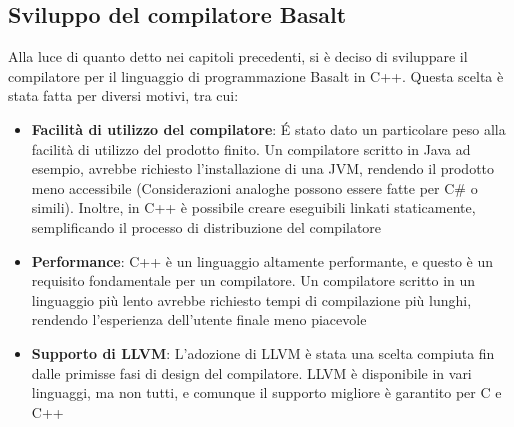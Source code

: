 \subsection{Sviluppo del compilatore Basalt}
Alla luce di quanto detto nei capitoli precedenti, si è deciso di sviluppare il compilatore 
per il linguaggio di programmazione Basalt in C++. Questa scelta è stata fatta per diversi motivi, 
tra cui:

\begin{itemize}
    \item \textbf{Facilità di utilizzo del compilatore}: É stato dato un particolare peso alla facilità di utilizzo 
    del prodotto finito. Un compilatore scritto in Java ad esempio, avrebbe richiesto l'installazione di una JVM, 
    rendendo il prodotto meno accessibile (Considerazioni analoghe possono essere fatte per C\# o simili). 
    Inoltre, in C++ è possibile creare eseguibili linkati staticamente, semplificando il processo di 
    distribuzione del compilatore
    
    \item \textbf{Performance}: C++ è un linguaggio altamente performante, e questo è un requisito
    fondamentale per un compilatore. Un compilatore scritto in un linguaggio più lento avrebbe richiesto
    tempi di compilazione più lunghi, rendendo l'esperienza dell'utente finale meno piacevole

    \item \textbf{Supporto di LLVM}: L'adozione di LLVM è stata una scelta compiuta fin dalle primisse fasi di 
    design del compilatore. LLVM è disponibile in vari linguaggi, ma non tutti, e comunque il supporto migliore
    è garantito per C e C++
\end{itemize}


